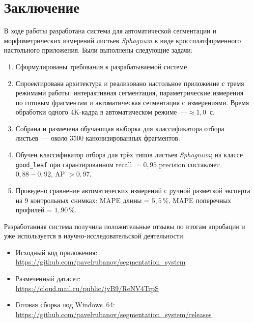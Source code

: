 
\section*{Заключение}
\label{sec:conclusion}

В ходе работы разработана система для автоматической сегментации и
морфометрических измерений листьев \textit{Sphagnum} в виде кроссплатформенного настольного
приложения. Были выполнены следующие задачи:

\begin{enumerate}
    \item Сформулированы требования к разрабатываемой системе.

    \item Спроектирована архитектура и реализовано настольное приложение с тремя режимами
          работы: интерактивная сегментация, параметрические измерения по
          готовым фрагментам и автоматическая сегментация с измерениями.
          Время обработки одного 4K-кадра в автоматическом режиме~---$\approx 1{,}0$~с.

    \item Собрана и размечена обучающая выборка для классификатора отбора
          листьев~--- около $3500$ канонизированных фрагментов.

    \item Обучен классификатор отбора для трёх типов листьев
          \textit{Sphagnum}; на классе \texttt{good\_leaf} при гарантированном
          recall $= 0{,}95$ precision составляет $0{,}88\!-\!0{,}92$,
          AP $> 0{,}97$.

    \item Проведено сравнение автоматических измерений с ручной разметкой
          эксперта на $9$ контрольных снимках: MAPE длины = $5{,}5\,\%$,
          MAPE поперечных профилей = $1{,}90\,\%$.
\end{enumerate}

Разработанная система получила положительные отзывы по итогам апробации и уже
используется в научно-исследовательской деятельности.

\begin{itemize}
    \item Исходный код приложения: \\
          \url{https://github.com/pavelrubanov/segmentation_system}
    \item Размеченный датасет: \\
          \url{https://cloud.mail.ru/public/jvB9/ReNV4TrpS}
    \item Готовая сборка под Windows~64: \\
          \url{https://github.com/pavelrubanov/segmentation_system/releases}
\end{itemize}
